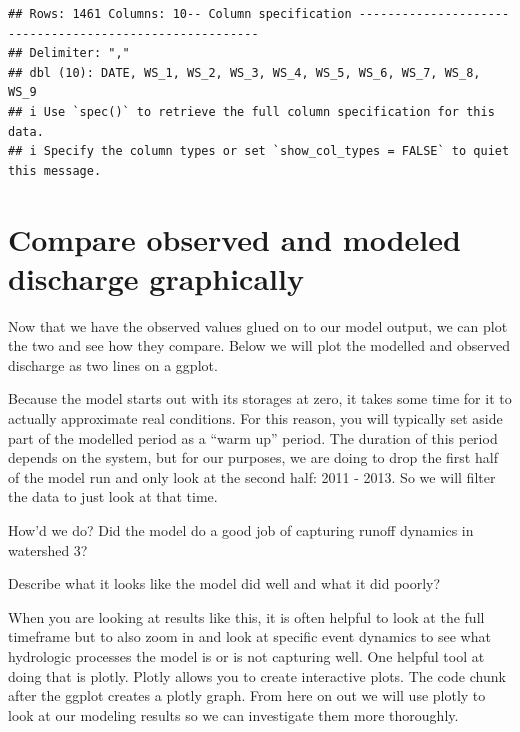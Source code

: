 \documentclass[
]{book}
\newenvironment{Shaded}{\begin{snugshade}}{\end{snugshade}}
\newcommand{\FunctionTok}[1]{\textcolor[rgb]{0.00,0.00,0.00}{#1}}
\newcommand{\NormalTok}[1]{#1}
\newcommand{\OtherTok}[1]{\textcolor[rgb]{0.56,0.35,0.01}{#1}}
\newcommand{\SpecialCharTok}[1]{\textcolor[rgb]{0.00,0.00,0.00}{#1}}
\begin{document}
\begin{verbatim}
## Rows: 1461 Columns: 10-- Column specification --------------------------------------------------------
## Delimiter: ","
## dbl (10): DATE, WS_1, WS_2, WS_3, WS_4, WS_5, WS_6, WS_7, WS_8, WS_9
## i Use `spec()` to retrieve the full column specification for this data.
## i Specify the column types or set `show_col_types = FALSE` to quiet this message.
\end{verbatim}

\begin{Shaded}
\end{Shaded}

\hypertarget{compare-observed-and-modeled-discharge-graphically}{%
\section{Compare observed and modeled discharge graphically}\label{compare-observed-and-modeled-discharge-graphically}}

Now that we have the observed values glued on to our model output, we can plot the two and see how they compare. Below we will plot the modelled and observed discharge as two lines on a ggplot.

Because the model starts out with its storages at zero, it takes some time for it to actually approximate real conditions. For this reason, you will typically set aside part of the modelled period as a ``warm up'' period. The duration of this period depends on the system, but for our purposes, we are doing to drop the first half of the model run and only look at the second half: 2011 - 2013. So we will filter the data to just look at that time.

How'd we do? Did the model do a good job of capturing runoff dynamics in watershed 3?

Describe what it looks like the model did well and what it did poorly?

When you are looking at results like this, it is often helpful to look at the full timeframe but to also zoom in and look at specific event dynamics to see what hydrologic processes the model is or is not capturing well. One helpful tool at doing that is plotly. Plotly allows you to create interactive plots. The code chunk after the ggplot creates a plotly graph. From here on out we will use plotly to look at our modeling results so we can investigate them more thoroughly.
\end{document}
